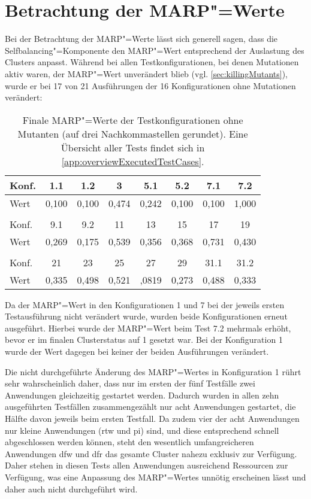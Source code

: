 \section{Betrachtung der MARP"=Werte}
\label{sec:marpValueResults}

Bei der Betrachtung der \gls{MARP}"=Werte lässt sich generell sagen, dass die Selfbalancing"=Komponente den \gls{MARP}"=Wert entsprechend der Auslastung des Clusters anpasst.
Während bei allen Testkonfigurationen, bei denen Mutationen aktiv waren, der \gls{MARP}"=Wert unverändert blieb (vgl. \cref{sec:killingMutants}), wurde er bei 17 von 21 Ausführungen der 16 Konfigurationen ohne Mutationen verändert:

\begin{table}[h]
    \begin{tabular}{l|c|c|c|c|c|c|c}
    	Konf. &  1.1  &  1.2  &   3   &  5.1  &  5.2  &  7.1  &  7.2  \\ \hline
    	Wert  & 0,100 & 0,100 & 0,474 & 0,242 & 0,100 & 0,100 & 1,000 \\
    	\multicolumn{8}{c}{} \\
    	Konf. &  9.1  &  9.2  &  11   &  13   &  15   &  17   &  19   \\ \hline
    	Wert  & 0,269 & 0,175 & 0,539 & 0,356 & 0,368 & 0,731 & 0,430 \\
    	\multicolumn{8}{c}{} \\
    	Konf. &  21   &  23   &  25   &  27   &  29   & 31.1  & 31.2  \\ \hline
    	Wert  & 0,335 & 0,498 & 0,521 & ,0819 & 0,273 & 0,488 & 0,333
    \end{tabular}
    \caption[Finale "=Werte der Testkonfigurationen ohne Mutanten.]
    {Finale \acrshort{MARP}"=Werte der Testkonfigurationen ohne Mutanten (auf drei Nachkommastellen gerundet).
    Eine Übersicht aller Tests findet sich in \cref{app:overviewExecutedTestCases}.}
    \label{tab:finalMarpValues}
\end{table}

Da der \gls{MARP}"=Wert in den Konfigurationen 1 und 7 bei der jeweils ersten Testausführung nicht verändert wurde, wurden beide Konfigurationen erneut ausgeführt.
Hierbei wurde der \gls{MARP}"=Wert beim Test 7.2 mehrmals erhöht, bevor er im finalen Clusterstatus auf 1 gesetzt war.
Bei der Konfiguration 1 wurde der Wert dagegen bei keiner der beiden Ausführungen verändert.

Die nicht durchgeführte Änderung des \gls{MARP}"=Wertes in Konfiguration 1 rührt sehr wahrscheinlich daher, dass nur im ersten der fünf Testfälle zwei Anwendungen gleichzeitig gestartet werden.
Dadurch wurden in allen zehn ausgeführten Testfällen zusammengezählt nur acht Anwendungen gestartet, die Hälfte davon jeweils beim ersten Testfall.
Da zudem vier der acht Anwendungen nur kleine Anwendungen (\acrlong{rtw} und \acrlong{pi}) sind, und diese entsprechend schnell abgeschlossen werden können, steht den wesentlich umfangreicheren Anwendungen \acrlong{dfw} und \acrlong{dfr} das gesamte Cluster nahezu exklusiv zur Verfügung.
Daher stehen in diesen Tests allen Anwendungen ausreichend Ressourcen zur Verfügung, was eine Anpassung des \gls{MARP}"=Wertes unnötig erscheinen lässt und daher auch nicht durchgeführt wird.

